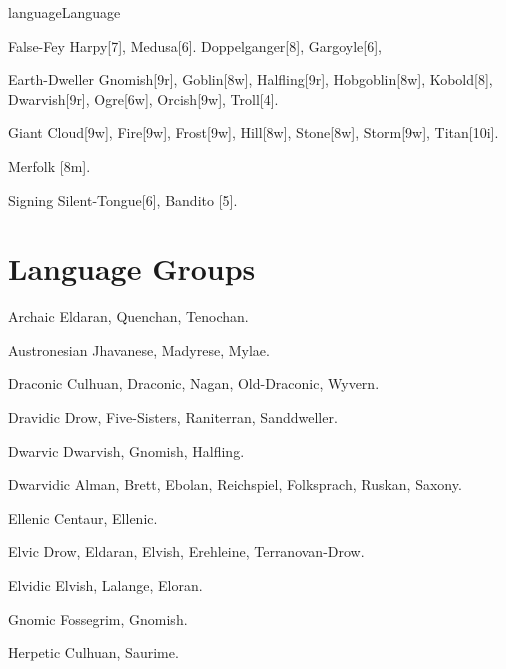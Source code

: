 \begin{Skill}[2.1]{language}{Language}
\begin{Description}
\item[False-Fey] Harpy[7], Medusa[6].  Doppelganger[8], Gargoyle[6],

\item[Earth-Dweller] Gnomish[9r], Goblin[8w], Halfling[9r],
  Hobgoblin[8w], Kobold[8], Dwarvish[9r], Ogre[6w], Orcish[9w],
  Troll[4].

\item[Giant] Cloud[9w], Fire[9w], Frost[9w], Hill[8w], Stone[8w],
  Storm[9w], Titan[10i].

\item[Merfolk] [8m]. 

\item[Signing] Silent-Tongue[6], Bandito [5]. 
  
\end{Description}

\section{Language Groups}

\begin{Description}

\item[Archaic] Eldaran, Quenchan, Tenochan.

\item[Austronesian] Jhavanese, Madyrese, Mylae. 

\item[Draconic] Culhuan, Draconic, Nagan, Old-Draconic, Wyvern.

\item[Dravidic] Drow, Five-Sisters, Raniterran, Sanddweller.

\item[Dwarvic] Dwarvish, Gnomish, Halfling.

\item[Dwarvidic] Alman, Brett, Ebolan, Reichspiel, Folksprach, Ruskan,
  Saxony.

\item[Ellenic] Centaur, Ellenic.

\item[Elvic] Drow, Eldaran, Elvish, Erehleine, Terranovan-Drow.

\item[Elvidic] Elvish, Lalange, Eloran.  

\item[Gnomic] Fossegrim, Gnomish.  

\item[Herpetic] Culhuan, Saurime. 


\end{Description}
\end{Skill}
